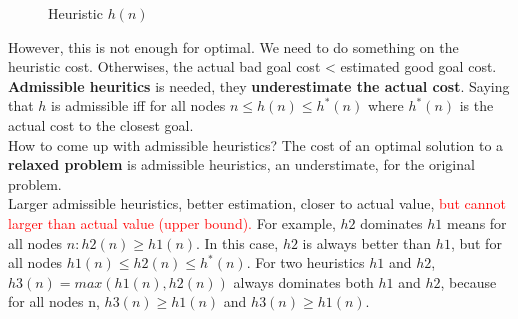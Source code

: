 \begin{figure}[htbp]
    \centering
    \caption{Heuristic $h(n)$}
    \label{fig:greedy_search_heuristic}
\end{figure}

\noindent
However, this is not enough for optimal. We need to do something on the heuristic cost. Otherwises, the actual bad goal cost < estimated good goal cost. \textbf{Admissible heuritics} is needed, they \textbf{underestimate the actual cost}. Saying that $h$ is admissible iff for all nodes $n \le h(n) \le h^{*}(n)$ where $h^{*}(n)$ is the actual cost to the closest goal. \\
How to come up with admissible heuristics? The cost of an optimal solution to a \textbf{relaxed problem} is admissible heuristics, an understimate, for the original problem. \\
Larger admissible heuristics, better estimation, closer to actual value, \textcolor{red}{but cannot larger than actual value (upper bound).} For example, $h2$ dominates $h1$ means for all nodes $n: h2(n) \ge h1(n)$. In this case, $h2$ is always better than $h1$, but for all nodes $h1(n) \le h2(n) \le h^{*}(n)$. For two heuristics $h1$ and $h2$, $h3(n) = max(h1(n),h2(n))$ always dominates both $h1$ and $h2$, because for all nodes n, $h3(n) \ge h1(n)$ and $h3(n) \ge h1(n)$.


